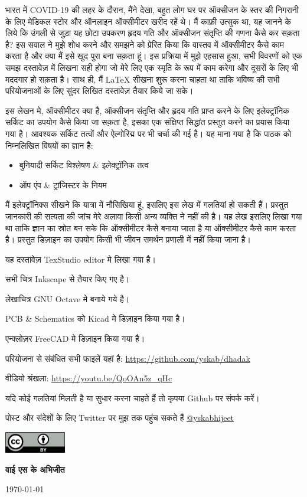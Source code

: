 भारत में COVID-19 की लहर के दौरान, मैंने देखा, बहुत लोग घर पर ऑक्सीजन के स्तर की निगरानी के लिए मेडिकल स्टोर और ऑनलाइन ऑक्सीमीटर खरीद रहें थे। मैं काफ़ी उत्सुक था, यह जानने के लिये कि उंगली से जुड़ा यह छोटा उपकरण हृदय गति और ऑक्सीजन संतृप्ति की गणना कैसे कर सक़ता है? इस सवाल ने मुझे शोध करने और समझने को प्रेरित किया कि वास्तव में ऑक्सीमीटर कैसे काम करता है और क्या मैं इसे खुद पुरा बना सक़ता हूं। इस प्रक्रिया में मुझे एहसास हुआ, सभी विवरणों को एक समझ दस्तावेज़ में लिखना सही होगा जो मेरे लिए एक स्मृति के रूप में काम करेगा और दूसरों के लिए भी मददगार हो सक़ता है।
साथ ही, मैं \LaTeX \hspace{1pt} सीखना शुरू करना चाहता था ताकि भविष्य की सभी परियोजनाओं के लिए सुंदर लिखित दस्तावेज़ तैयार किये जा सके।\bigskip

इस लेखन मे, ऑक्सीमीटर क्या है, ऑक्सीजन संतृप्ति और हृदय गति प्राप्त करने के लिए इलेक्ट्रॉनिक सर्किट का उपयोग कैसे किया जा सक़ता है, इसका एक संक्षिप्त सिद्धांत प्रस्तुत करने का प्रयास किया गया है। आवश्यक सर्किट तत्वों और ऐल्गोरिद्म पर भी चर्चा की गई है। यह माना गया है कि पाठक को निम्नलिखित विषयों का ज्ञान हैै:

\begin{itemize}
	\item बुनियादी सर्किट विश्लेषण \& इलेक्ट्रॉनिक तत्व
	\item ऑप एंप \& ट्रांजिस्टर के नियम
\end{itemize}

\bigskip

मैं इलेक्ट्रॉनिक्स सीखने कि यात्रा में नौसिखिया हूं, इसलिए इस लेख में गलतियां हो सकती हैं। प्रस्तुत जानकारी की सत्यता की जांच मेरे अलावा किसी अन्य व्यक्ति ने नहीं की है।
यह लेख इसलिए लिखा गया था ताकि ज्ञान का स्रोत बन सके कि ऑक्सीमीटर कैसे बनाया जाता है या ऑक्सीमीटर कैसे काम करता है। प्रस्तुत डिज़ाइन का उपयोग किसी भी जीवन समर्थन प्रणाली में नहीं किया जाना है।

\bigskip
यह दस्तावेज़ TexStudio editor मे लिखा गया है।	

सभी चित्र Inkscape से तैयार किए गए है।

लेखाचित्र GNU Octave मे बनाये गये है।

PCB \& Schematics को Kicad मे डिज़ाइन किया गया है।

एन्क्लोज़र FreeCAD मे डिज़ाइन किया गया है।

\medskip
परियोजना से संबंधित सभी फाइलें यहां है: \url{https://github.com/yskab/dhadak}

वीडियो श्रंखला: \url{https://youtu.be/QoOAn5z_qHc}

\medskip
यदि कोई गलतियां मिलती है या सुधार करना चाहते हैं तो कृपया Github पर संपर्क करें। 

\medskip
पोस्ट और संदेशों के लिए Twitter पर मुझ तक पहुंच सकते हैं 
\href{https://twitter.com/yskabhijeet}{@yskabhijeet}

\includegraphics[width=0.2\textwidth]{../common/cc.png}\par

\vfill
\hfill
{\Large\bfseries वाई एस के अभिजीत}\par
\hfill
\large \today